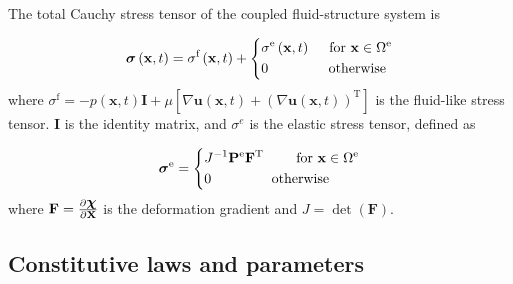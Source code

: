 \documentclass[fleqn,10pt]{wlscirep}
\def\bm#1{\mbox{\boldmath{$#1$}}}
\newcommand*{\V}[1]{\bm{\mathbf #1}}
\begin{document}
The total Cauchy stress tensor of the coupled fluid-structure system is

\begin{equation}\label{equ33}
\bm{\sigma}\left( {{\mathbf{x}},t} \right) = {\sigma ^{\text{f}}}\left( {{\mathbf{x}},t} \right) + \left\{ \begin{gathered}
{\sigma^{\text{e}}}\left( {{\mathbf{x}},t} \right){\text{    }}\quad \mathrm{for}\ {\mathbf{x}} \in {\Omega ^{\text{e}}}\hfill \\
0{\text{               }}\qquad\qquad \mathrm{otherwise}  \hfill \\
\end{gathered}  \right.
\end{equation}
where ${\sigma ^{\text{f}}} =  - p\left( {{\mathbf{x}},t} \right)\mathbf{I}+ \mu \left[ {\nabla {\mathbf{u}}\left( {{\mathbf{x}},t} \right) + {{\left( {\nabla {\mathbf{u}}\left( {{\mathbf{x}},t} \right)} \right)}^{\text{T}}}} \right]$  is the fluid-like stress tensor. $\mathbf{I}$ is the identity matrix, and $\sigma^{e}$ is the elastic stress tensor, defined as

\begin{equation}\label{equ33}
\V{\sigma} ^{\text{e}} =
\left\{ \begin{gathered}
J^{-1}\mathbf{P}^{\text{e}}\mathbf{F}^{\text{T}} {\text{    }}\qquad \mathrm{for} \ \mathbf{x}\in \Omega^{\text{e}}  \hfill \\
0{\text{                  }}\qquad\qquad \mathrm{otherwise} \hfill \\
\end{gathered}  \right.
\end{equation}
where $\mathbf{F}=\frac{\partial \V{\chi}}{\partial \mathbf{X}}$ is the  deformation gradient and $J = \det(\mathbf{F})$.

\subsection*{Constitutive laws and  parameters}
\end{document}
